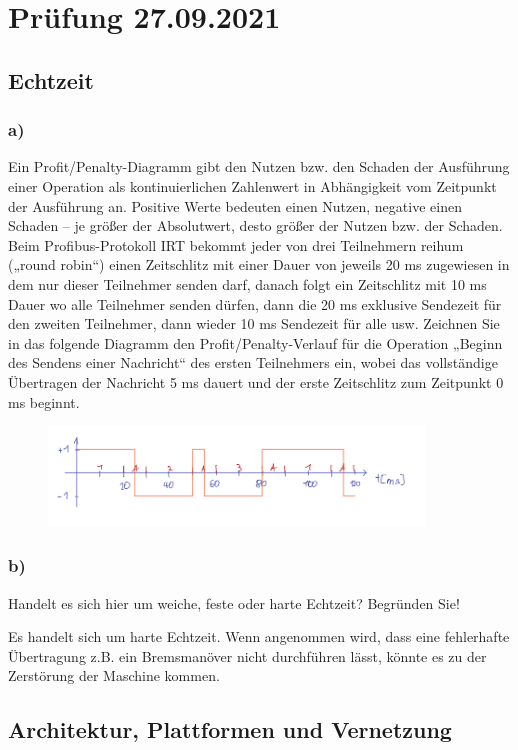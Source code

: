 \section{Prüfung 27.09.2021}
\subsection{Echtzeit}
\subsubsection{a)}
Ein Profit/Penalty-Diagramm gibt den Nutzen bzw. den Schaden der Ausführung einer Operation als
kontinuierlichen Zahlenwert in Abhängigkeit vom Zeitpunkt der Ausführung an. Positive Werte
bedeuten einen Nutzen, negative einen Schaden – je größer der Absolutwert, desto größer der Nutzen
bzw. der Schaden.
Beim Profibus-Protokoll IRT bekommt jeder von drei Teilnehmern reihum („round robin“) einen
Zeitschlitz mit einer Dauer von jeweils 20 ms zugewiesen in dem nur dieser Teilnehmer senden darf,
danach folgt ein Zeitschlitz mit 10 ms Dauer wo alle Teilnehmer senden dürfen, dann die 20 ms
exklusive Sendezeit für den zweiten Teilnehmer, dann wieder 10 ms Sendezeit für alle usw. Zeichnen
Sie in das folgende Diagramm den Profit/Penalty-Verlauf für die Operation „Beginn des Sendens einer
Nachricht“ des ersten Teilnehmers ein, wobei das vollständige Übertragen der Nachricht 5 ms dauert
und der erste Zeitschlitz zum Zeitpunkt 0 ms beginnt.
\begin{figure}[H]
  \includegraphics[width=10cm]{images/KA270921/1a.PNG}
  \centering
\end{figure}

\subsubsection{b)}
Handelt es sich hier um weiche, feste oder harte Echtzeit? Begründen Sie!

Es handelt sich um harte Echtzeit. Wenn angenommen wird, dass eine fehlerhafte Übertragung z.B. ein Bremsmanöver
nicht durchführen lässt, könnte es zu der Zerstörung der Maschine kommen.

\subsection{Architektur, Plattformen und Vernetzung}
